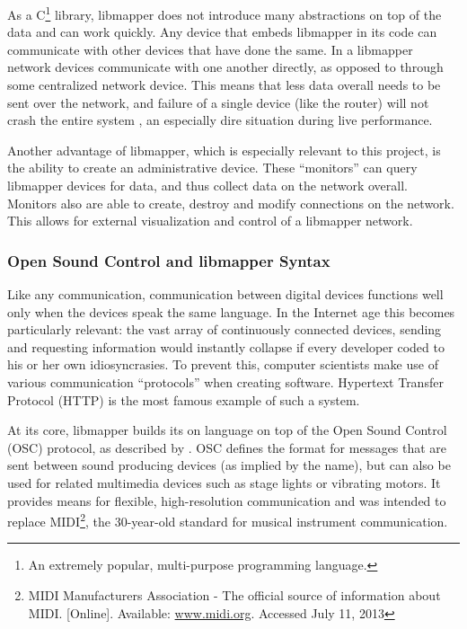 As a C\footnote{An extremely popular, multi-purpose programming language.} library, libmapper does not introduce many abstractions on top of the data and can work quickly. Any device that embeds libmapper in its code can communicate with other devices that have done the same. In a libmapper network devices communicate with one another directly, as opposed to through some centralized network device. This means that less data overall needs to be sent over the network, and failure of a single device (like the router) will not crash the entire system , an especially dire situation during live performance.

Another advantage of libmapper, which is especially relevant to this project, is the ability to create an administrative device. These ``monitors'' can query libmapper devices for data, and thus collect data on the network overall. Monitors also are able to create, destroy and modify connections on the network. This allows for external visualization and control of a libmapper network.

	\subsubsection{Open Sound Control and libmapper Syntax}

Like any communication, communication between digital devices functions well only when the devices speak the same language. In the Internet age this becomes particularly relevant: the vast array of continuously connected devices, sending and requesting information would instantly collapse if every developer coded to his or her own idiosyncrasies. To prevent this, computer scientists make use of various communication ``protocols'' when creating software. Hypertext Transfer Protocol (HTTP) is the most famous example of such a system.

At its core, libmapper builds its on language on top of the Open Sound Control (OSC) protocol, as described by . OSC defines the format for messages that are sent between sound producing devices (as implied by the name), but can also be used for related multimedia devices such as stage lights or vibrating motors. It provides means for flexible, high-resolution communication and was intended to replace MIDI\footnote{MIDI Manufacturers Association - The official source of information about MIDI. [Online]. Available: \url{www.midi.org}. Accessed July 11, 2013}, the 30-year-old standard for musical instrument communication. 

